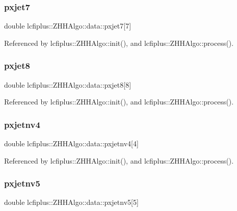 \subsubsection{pxjet7}
{\footnotesize\ttfamily double lcfiplus\+::\+Z\+H\+H\+Algo\+::data\+::pxjet7[7]}



Referenced by lcfiplus\+::\+Z\+H\+H\+Algo\+::init(), and lcfiplus\+::\+Z\+H\+H\+Algo\+::process().

\mbox{\label{structlcfiplus_1_1ZHHAlgo_1_1data_adcdc3fbe3204cf194a333817277b2fab}} 
\subsubsection{pxjet8}
{\footnotesize\ttfamily double lcfiplus\+::\+Z\+H\+H\+Algo\+::data\+::pxjet8[8]}



Referenced by lcfiplus\+::\+Z\+H\+H\+Algo\+::init(), and lcfiplus\+::\+Z\+H\+H\+Algo\+::process().

\mbox{\label{structlcfiplus_1_1ZHHAlgo_1_1data_acfe04f4f17a7eca32bb91d2d41e756f4}} 
\subsubsection{pxjetnv4}
{\footnotesize\ttfamily double lcfiplus\+::\+Z\+H\+H\+Algo\+::data\+::pxjetnv4[4]}



Referenced by lcfiplus\+::\+Z\+H\+H\+Algo\+::init(), and lcfiplus\+::\+Z\+H\+H\+Algo\+::process().

\mbox{\label{structlcfiplus_1_1ZHHAlgo_1_1data_a8139870d9d41f10b18d5a1d8b2aa3825}} 
\subsubsection{pxjetnv5}
{\footnotesize\ttfamily double lcfiplus\+::\+Z\+H\+H\+Algo\+::data\+::pxjetnv5[5]}



